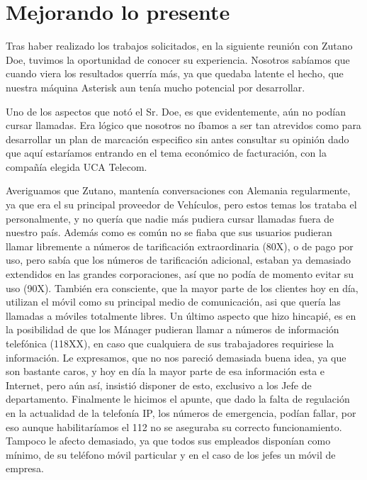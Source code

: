 
\newpage

\color[rgb]{0,0,1}

\section{Mejorando lo presente}

Tras haber realizado los trabajos solicitados, en la siguiente reunión con Zutano Doe, tuvimos la oportunidad de conocer su experiencia. Nosotros sabíamos que cuando viera los resultados querría más, ya que quedaba latente el hecho, que nuestra máquina Asterisk aun tenía mucho potencial por desarrollar.

Uno de los aspectos que notó el Sr. Doe, es que evidentemente, aún no podían cursar llamadas. Era lógico que nosotros no íbamos a ser tan atrevidos como para desarrollar un plan de marcación especifico sin antes consultar su opinión dado que aquí estaríamos entrando en el tema económico de facturación, con la compañía elegida UCA Telecom.

Averiguamos que Zutano, mantenía conversaciones con Alemania regularmente, ya que era el su principal proveedor de Vehículos, pero estos temas los trataba el personalmente, y no quería que nadie más pudiera cursar llamadas fuera de nuestro país. Además como es común no se fiaba que sus usuarios pudieran llamar libremente a números de tarificación extraordinaria (80X), o de pago por uso, pero sabía que los números de tarificación adicional, estaban ya demasiado extendidos en las grandes corporaciones, así que no podía de momento evitar su uso (90X). También era consciente, que la mayor parte de los clientes hoy en día, utilizan el móvil como su principal medio de comunicación, asi que quería las llamadas a móviles totalmente libres. Un último aspecto que hizo hincapié, es en la posibilidad de que los Mánager pudieran llamar a números de información telefónica (118XX), en caso que cualquiera de sus trabajadores requiriese la información. Le expresamos, que no nos pareció demasiada buena idea, ya que son bastante caros, y hoy en día la mayor parte de esa información esta e Internet, pero aún así, insistió disponer de esto, exclusivo a los Jefe de departamento. Finalmente le hicimos el apunte, que dado la falta de regulación en la actualidad de la telefonía IP, los números de emergencia, podían fallar, por eso aunque habilitaríamos el 112 no se aseguraba su correcto funcionamiento. Tampoco le afecto demasiado, ya que todos sus empleados disponían como mínimo, de su teléfono móvil particular y en el caso de los jefes un móvil de empresa.

